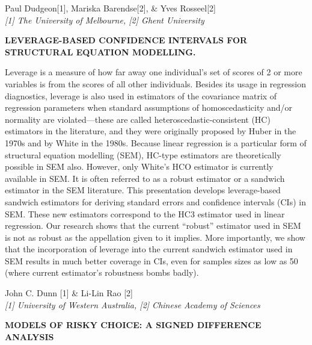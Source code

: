 \documentclass[]{article}
\begin{document}
Paul Dudgeon{[}1{]}, Mariska Barendse{[}2{]}, \& Yves Rosseel{[}2{]}\\
\emph{{[}1{]} The University of Melbourne, {[}2{]} Ghent University}

\textbf{LEVERAGE-BASED CONFIDENCE INTERVALS FOR STRUCTURAL EQUATION
MODELLING.}

Leverage is a measure of how far away one individual's set of scores of
2 or more variables is from the scores of all other individuals. Besides
its usage in regression diagnostics, leverage is also used in estimators
of the covariance matrix of regression parameters when standard
assumptions of homoscedasticity and/or normality are violated---these
are called heteroscedastic-consistent (HC) estimators in the literature,
and they were originally proposed by Huber in the 1970s and by White in
the 1980s. Because linear regression is a particular form of structural
equation modelling (SEM), HC-type estimators are theoretically possible
in SEM also. However, only White's HCO estimator is currently available
in SEM. It is often referred to as a robust estimator or a sandwich
estimator in the SEM literature. This presentation develops
leverage-based sandwich estimators for deriving standard errors and
confidence intervals (CIs) in SEM. These new estimators correspond to
the HC3 estimator used in linear regression. Our research shows that the
current ``robust'' estimator used in SEM is not as robust as the
appellation given to it implies. More importantly, we show that the
incorporation of leverage into the current sandwich estimator used in
SEM results in much better coverage in CIs, even for samples sizes as
low as 50 (where current estimator's robustness bombs badly).\\
\pagebreak  

John C. Dunn {[}1{]} \& Li-Lin Rao {[}2{]}\\
\emph{{[}1{]} University of Western Australia, {[}2{]} Chinese Academy
of Sciences}

\textbf{MODELS OF RISKY CHOICE: A SIGNED DIFFERENCE ANALYSIS}
\end{document}
